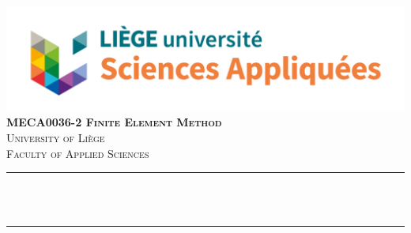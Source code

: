 \begin{titlepage}

\newcommand{\HRule}{\rule{\linewidth}{0.5mm}} %





\begin{center} %


\includegraphics[width = 15cm]{./figures/uliege_faculte_sciencesappliquees_logo_rvb}\\[1.5cm] 
\textbf{\textsc{\Large MECA0036-2 Finite Element Method}}\\[1.0cm] 
\textsc{\Large University of Liège}\\[0.5cm] 
\textsc{\large Faculty of Applied Sciences}\\[0.95cm] 


\HRule \\[0.4cm]
{ \huge \bfseries \reporttitle}\\ %
\HRule \\[1.5cm]
\end{center}



\end{titlepage}
